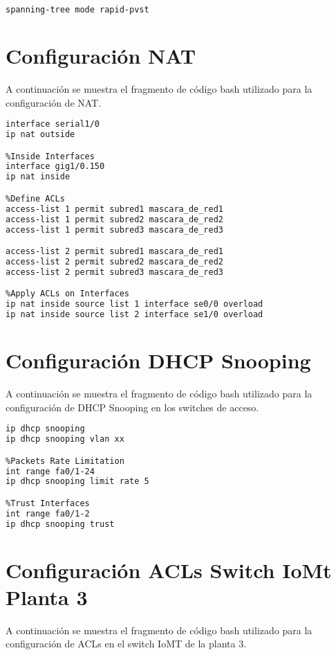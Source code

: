 \begin{lstlisting}[language=Bash, caption={Configuración RSTP}]
spanning-tree mode rapid-pvst 
\end{lstlisting}

\section{Configuración NAT}\label{anexo:nat}
A continuación se muestra el fragmento de código bash utilizado para la configuración de NAT.

\begin{lstlisting}[language=Bash, caption={Configuración NAT}]
%Outside Interfaces
interface serial1/0 
ip nat outside 

%Inside Interfaces
interface gig1/0.150
ip nat inside 

%Define ACLs
access-list 1 permit subred1 mascara_de_red1
access-list 1 permit subred2 mascara_de_red2
access-list 1 permit subred3 mascara_de_red3

access-list 2 permit subred1 mascara_de_red1
access-list 2 permit subred2 mascara_de_red2
access-list 2 permit subred3 mascara_de_red3

%Apply ACLs on Interfaces
ip nat inside source list 1 interface se0/0 overload 
ip nat inside source list 2 interface se1/0 overload 
\end{lstlisting}

\section{Configuración DHCP Snooping}\label{anexo:snooping}
A continuación se muestra el fragmento de código bash utilizado para la configuración de DHCP Snooping en los switches de acceso.

\begin{lstlisting}[language=Bash, caption={Configuración DHCP Snooping}]
%Active DHCP Snooping
ip dhcp snooping 
ip dhcp snooping vlan xx

%Packets Rate Limitation
int range fa0/1-24 
ip dhcp snooping limit rate 5 

%Trust Interfaces
int range fa0/1-2 
ip dhcp snooping trust 
\end{lstlisting}

\section{Configuración ACLs Switch IoMt Planta 3}\label{anexo:aclIoMTP3}
A continuación se muestra el fragmento de código bash utilizado para la configuración de ACLs en el switch IoMT de la planta 3.

